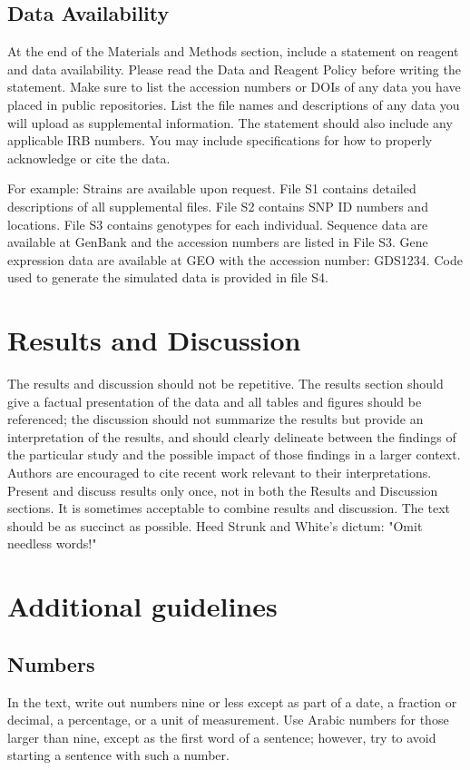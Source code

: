\documentclass[9pt,twocolumn,twoside]{gsajnl}
\begin{document}
\subsection{Data Availability}

At the end of the Materials and Methods section, include a statement on reagent and data availability. Please read the Data and Reagent Policy before writing the statement. Make sure to list the accession numbers or DOIs of any data you have placed in public repositories. List the file names and descriptions of any data you will upload as supplemental information. The statement should also include any applicable IRB numbers. You may include specifications for how to properly acknowledge or cite the data.

For example: Strains are available upon request. File S1 contains detailed descriptions of all supplemental files. File S2 contains SNP ID numbers and locations. File S3 contains genotypes for each individual. Sequence data are available at GenBank and the accession numbers are listed in File S3. Gene expression data are available at GEO with the accession number: GDS1234. Code used to generate the simulated data is provided in file S4. 


\section{Results and Discussion}

The results and discussion should not be repetitive. The results section should give a factual presentation of the data and all tables and figures should be referenced; the discussion should not summarize the results but provide an interpretation of the results, and should clearly delineate between the findings of the particular study and the possible impact of those findings in a larger context. Authors are encouraged to cite recent work relevant to their interpretations. Present and discuss results only once, not in both the Results and Discussion sections. It is sometimes acceptable to combine results and discussion. The text should be as succinct as possible. Heed Strunk and White's dictum: "Omit needless words!"

\section{Additional guidelines}

\subsection{Numbers} In the text, write out numbers nine or less except as part of a date, a fraction or decimal, a percentage, or a unit of measurement. Use Arabic numbers for those larger than nine, except as the first word of a sentence; however, try to avoid starting a sentence with such a number.
\end{document}
